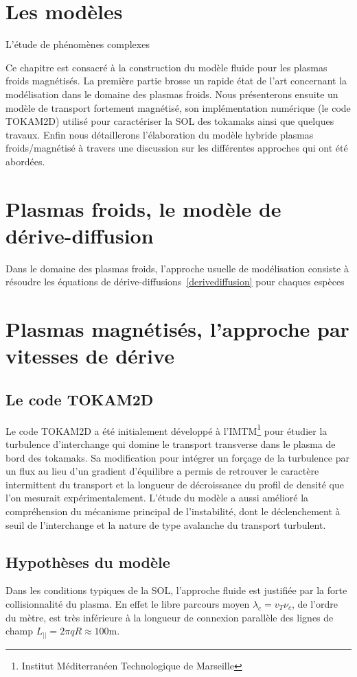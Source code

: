  	\section{Les modèles}
L'étude de phénomènes complexes 
 	
Ce chapitre est consacré à la construction du modèle fluide pour les plasmas
froids magnétisés.
La première partie brosse un rapide état de l'art concernant la modélisation
dans le domaine des plasmas froids. Nous présenterons ensuite un modèle de
transport fortement magnétisé, son implémentation numérique (le code TOKAM2D)
utilisé pour caractériser la SOL des tokamaks ainsi que quelques travaux. Enfin
nous détaillerons l'élaboration du modèle hybride plasmas froids/magnétisé à travers une
discussion sur les différentes approches qui ont été abordées.
	
	\section{Plasmas froids, le modèle de dérive-diffusion}
Dans le domaine des plasmas froids, l'approche usuelle de modélisation consiste
à résoudre les équations de dérive-diffusions~\eqref{derivediffusion} pour
chaques espèces
	\section{Plasmas magnétisés, l'approche par vitesses de dérive}
	 \subsection{Le code TOKAM2D}
Le code TOKAM2D a été initialement développé à l'IMTM\footnote{Institut Méditerranéen
Technologique de Marseille} pour étudier la turbulence d'interchange qui domine
le transport transverse dans le plasma de bord des tokamaks. Sa modification
pour intégrer un forçage de la turbulence par un flux au lieu d'un gradient
d'équilibre a permis de retrouver le caractère intermittent du
transport et la longueur de décroissance du profil de densité que l'on mesurait
expérimentalement. L'étude du modèle a aussi amélioré la compréhension du
mécanisme principal de l'instabilité, dont le déclenchement à seuil de
l'interchange et la nature de type avalanche du transport turbulent. 
		\subsection{Hypothèses du modèle}
Dans les conditions typiques de la SOL, l'approche fluide est justifiée par la forte collisionnalité 
du plasma. En effet le libre parcours moyen $\lambda_c=v_T \nu_c$, de l'ordre du mètre, est très 
inférieure à la longueur de connexion parallèle des lignes de champ $L_{||}=2\pi q R\approx 100\text{m}$.

